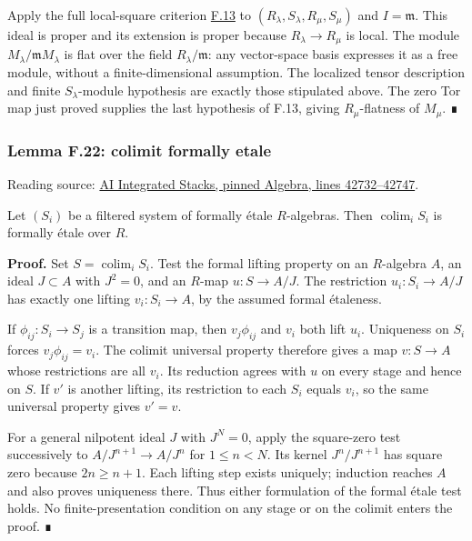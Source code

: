 \documentclass[11pt,a4paper,openany]{report}
\begin{document}
Apply the full local-square criterion \hyperref[AG-RG-S05-algebra-lemma-another-variant-local-criterion-flatness]{F.13} to \((R_\lambda,S_\lambda,R_\mu,S_\mu)\) and \(I=\mathfrak m\). This ideal is proper and its extension is proper because \(R_\lambda\to R_\mu\) is local. The module \(M_\lambda/\mathfrak mM_\lambda\) is flat over the field \(R_\lambda/\mathfrak m\): any vector-space basis expresses it as a free module, without a finite-dimensional assumption. The localized tensor description and finite \(S_\lambda\)-module hypothesis are exactly those stipulated above. The zero Tor map just proved supplies the last hypothesis of F.13, giving \(R_\mu\)-flatness of \(M_\mu\). ∎

\label{AG-RG-S05-algebra-lemma-colimit-formally-etale}

\subsubsection{Lemma F.22: colimit formally etale}\label{AG-RG-S05-lemma-f.22-colimit-formally-etale}

Reading source: \href{https://github.com/KokunoYumeto/unofficial-stacks-project-ai-drafts/blob/565b10e987aba5969b21145a0833f42d69f96790/algebra.tex\#L42732-L42747}{AI Integrated Stacks, pinned Algebra, lines 42732--42747}.

Let \((S_i)\) be a filtered system of formally étale \(R\)-algebras. Then \(\operatorname*{colim}_iS_i\) is formally étale over \(R\).

\textbf{Proof.} Set \(S=\operatorname*{colim}_iS_i\). Test the formal lifting property on an \(R\)-algebra \(A\), an ideal \(J\subset A\) with \(J^2=0\), and an \(R\)-map \(u:S\to A/J\). The restriction \(u_i:S_i\to A/J\) has exactly one lifting \(v_i:S_i\to A\), by the assumed formal étaleness.

If \(\phi_{ij}:S_i\to S_j\) is a transition map, then \(v_j\phi_{ij}\) and \(v_i\) both lift \(u_i\). Uniqueness on \(S_i\) forces \(v_j\phi_{ij}=v_i\). The colimit universal property therefore gives a map \(v:S\to A\) whose restrictions are all \(v_i\). Its reduction agrees with \(u\) on every stage and hence on \(S\). If \(v'\) is another lifting, its restriction to each \(S_i\) equals \(v_i\), so the same universal property gives \(v'=v\).

For a general nilpotent ideal \(J\) with \(J^N=0\), apply the square-zero test successively to \(A/J^{n+1}\to A/J^n\) for \(1\leq n<N\). Its kernel \(J^n/J^{n+1}\) has square zero because \(2n\geq n+1\). Each lifting step exists uniquely; induction reaches \(A\) and also proves uniqueness there. Thus either formulation of the formal étale test holds. No finite-presentation condition on any stage or on the colimit enters the proof. ∎
\end{document}
